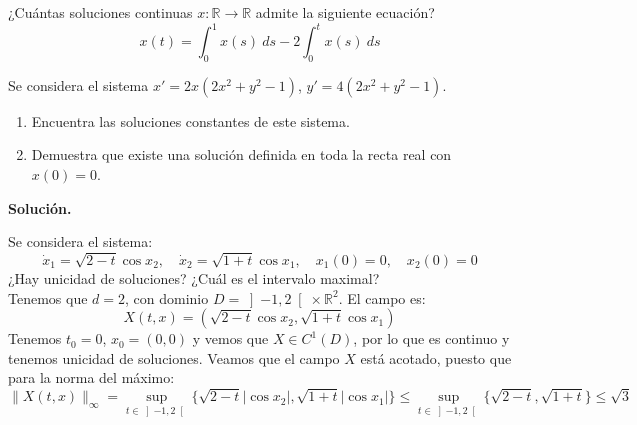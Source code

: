 \documentclass[12pt]{article}
\begin{document}
    \begin{ejercicio}
        ¿Cuántas soluciones continuas $x:\mathbb{R}\to\mathbb{R}$ admite la siguiente ecuación?
        \begin{equation*}
            x(t) = \int_{0}^{1} x(s)~ds  - 2 \int_{0}^{t} x(s)~ds 
        \end{equation*}
    \end{ejercicio}

    \begin{ejercicio}
        Se considera el sistema $x'=2x(2x^2+y^2-1)$, $y'=4(2x^2+y^2-1)$.
        \begin{enumerate}
            \item[$i)$] Encuentra las soluciones constantes de este sistema.
            \item[$ii)$] Demuestra que existe una solución definida en toda la recta real con $x(0) = 0$.       
        \end{enumerate}
    \end{ejercicio}

    \newpage
    \setcounter{ejercicio}{0} %
    \noindent
    \textbf{Solución.}

    \begin{ejercicio}
        Se considera el sistema:
        \begin{equation*}
            \dot{x}_1 = \sqrt{2-t}\cos x_2,\quad \dot{x}_2 = \sqrt{1+t}\cos x_1, \quad x_1(0) = 0, \quad x_2(0) = 0
        \end{equation*}
        ¿Hay unicidad de soluciones? ¿Cuál es el intervalo maximal?\\

        \noindent
        Tenemos que $d=2$, con dominio $D=\left]-1,2\right[\times \mathbb{R}^2$. El campo es:
        \begin{equation*}
            X(t,x) = \left(\sqrt{2-t}\cos x_2, \sqrt{1+t}\cos x_1\right)
        \end{equation*}
        Tenemos $t_0 = 0$, $x_0 = (0,0)$ y vemos que $X\in C^1(D)$, por lo que es continuo y tenemos unicidad de soluciones. Veamos que el campo $X$ está acotado, puesto que para la norma del máximo:
        \begin{equation*}
            \|X(t,x)\|_\infty = \sup_{t\in \left]-1,2\right[} \{\sqrt{2-t}|\cos x_2|, \sqrt{1+t}|\cos x_1|\} \leq \sup_{t\in \left]-1,2\right[} \{\sqrt{2-t},\sqrt{1+t}\} \leq \sqrt{3}
        \end{equation*}
    \end{ejercicio}
\end{document}
